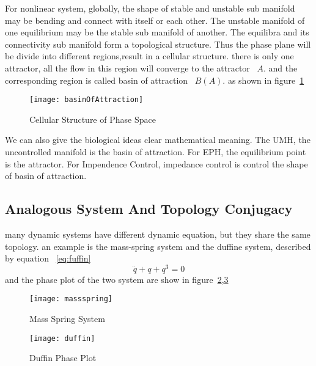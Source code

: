 For nonlinear system, globally, the shape of stable and unstable sub manifold may be bending and connect with itself or each other.
The unstable manifold of one equilibrium may be the stable sub manifold of another.
The equilibra and its connectivity sub manifold form a topological structure.
Thus the phase plane will be divide into different regions,result in a cellular structure.
there is only one attractor, all the flow in this region will converge to the attractor ~$A$.
and the corresponding region is called basin of attraction ~$B(A)$.
as shown in figure~\ref{fig:manyboa}
\begin{figure}
\begin{center}
\texttt{[image: basinOfAttraction]}
\end{center}
\caption{Cellular Structure of Phase Space}
\label{fig:manyboa}
\end{figure}


We can also give the biological ideas clear mathematical meaning.
The UMH, the uncontrolled manifold is the basin of attraction.
For EPH, the equilibrium point is the attractor.
For Impendence Control, impedance control is control the shape of basin of attraction.

\subsection{Analogous System And Topology Conjugacy}
many dynamic systems have different dynamic equation, but they share the same topology.
an example is the mass-spring system and the duffine system, described by equation ~\ref{eq:fuffin}
\begin{equation}
\label{eq:duffin}
\ddot{q}+q+q^{3}=0
\end{equation}
and the phase plot of the two system are show in figure~\ref{fig:msphaseplot},\ref{fig:duffin}

\begin{figure}
\begin{center}
\texttt{[image: massspring]}
\end{center}
\caption{Mass Spring System}
\label{fig:msphaseplot}
\end{figure}

\begin{figure}
\begin{center}
\texttt{[image: duffin]}
\end{center}
\caption{Duffin Phase Plot}
\label{fig:duffin}
\end{figure}


